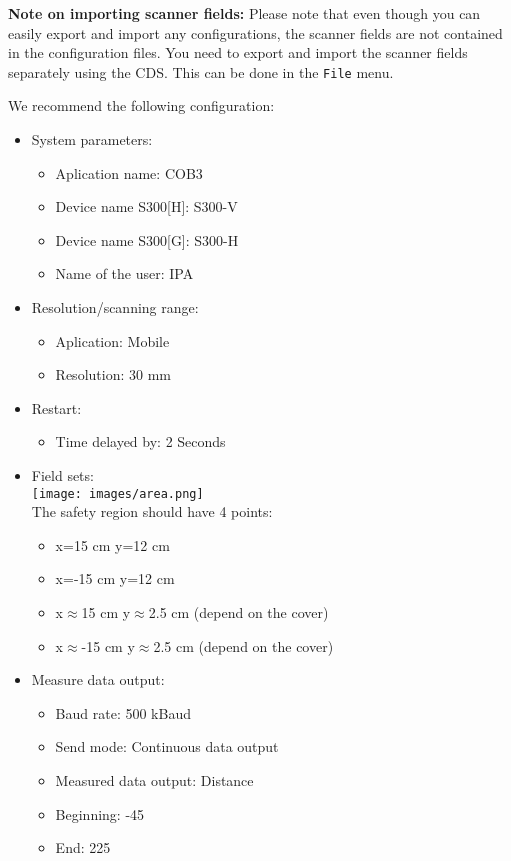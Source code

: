 \textbf{Note on importing scanner fields:}
Please note that even though you can easily export and import any configurations, the scanner fields are not contained in the configuration files.
You need to export and import the scanner fields separately using the CDS.
This can be done in the \texttt{File} menu.

We recommend the following configuration:
\begin{itemize}
\item System parameters:
\begin{itemize}
\item Aplication name: COB3
\item Device name S300[H]: S300-V
\item Device name S300[G]: S300-H
\item Name of the user: IPA
\end{itemize}
\item Resolution/scanning range:
\begin{itemize}
\item Aplication: Mobile
\item Resolution: 30 mm
\end{itemize}
\item Restart:
\begin{itemize}
\item Time delayed by: 2 Seconds
\end{itemize}
\item Field sets:
\\
\texttt{[image: images/area.png]}
\\ The safety region should have 4 points:
\begin{itemize}
\item x=15 cm y=12 cm
\item x=-15 cm y=12 cm
\item x$\approx$15 cm y$\approx$2.5 cm (depend on the cover)
\item x$\approx$-15 cm y$\approx$2.5 cm (depend on the cover)
\end{itemize}
\item Measure data output:
\begin{itemize}
\item Baud rate: 500 kBaud
\item Send mode: Continuous data output
\item Measured data output: Distance
\item Beginning: -45
\item End: 225
\end{itemize}
\end{itemize}

